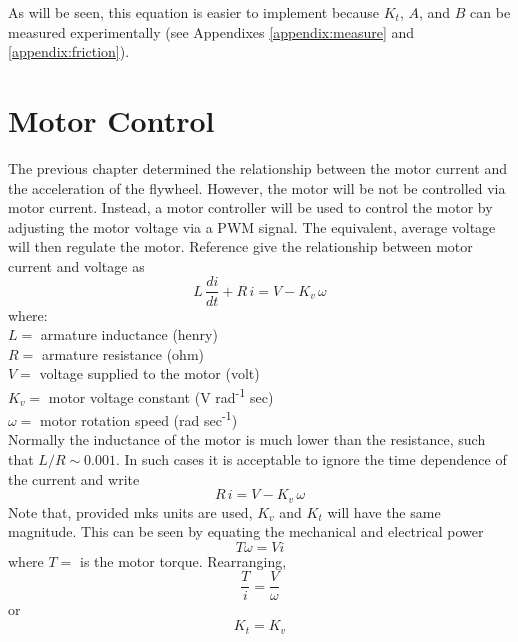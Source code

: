 \documentclass[12pt,letterpaper]{article}
\begin{document}
As will be seen, this equation is easier to implement because $K_{t}$, $A$, and $B$ can be measured experimentally (see Appendixes \ref{appendix:measure} and \ref{appendix:friction}).







\section{Motor Control}
The previous chapter determined the relationship between the motor current and the acceleration of the flywheel.  
However, the motor will be not be controlled via motor current.  Instead, a motor controller will be used to control the 
motor by adjusting the motor voltage via a PWM signal.  The equivalent, average voltage will then regulate the motor.  
Reference \cite{monograph} give the relationship between motor current and voltage as
%
\begin{equation}
    L \, \frac{di}{dt} + R \,i = V - K_{v} \, \omega
\end{equation}
%
where: \\
$L =$ armature inductance (henry) \\
$R =$ armature resistance (ohm) \\
$V =$ voltage supplied to the motor (volt) \\
$K_{v} =$ motor voltage constant (V  rad\textsuperscript{-1} sec) \\
$\omega =$ motor rotation speed (rad sec\textsuperscript{-1}) \\

Normally the inductance of the motor is much lower than the resistance, such that $L/R \sim 0.001$.  
In such cases it is acceptable to ignore the time dependence of the current and write
%
\begin{equation}
    R \,i = V - K_{v} \, \omega \label{motor}
\end{equation}
%
Note that, provided mks units are used, $K_{v}$ and $K_{t}$ will have the same magnitude.  This can be seen by equating the 
mechanical and electrical power
%
\begin{equation}
    T \omega = V i
\end{equation}
%
where $T =$ is the motor torque.
Rearranging,
%
\begin{equation}
    \frac{T}{i} = \frac{V}{\omega}
\end{equation}
%
or
%
\begin{equation}
    K_{t} = K_{v} 
\end{equation}
%
\end{document}
